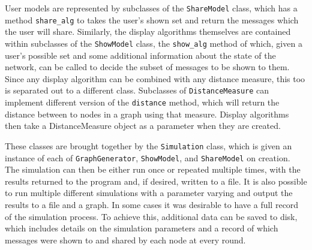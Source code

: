 \documentclass[bsc,frontabs,twoside,singlespacing,parskip,deptreport]{infthesis}     %
\begin{document}
User models are represented by subclasses of the \texttt{ShareModel} class, which has a method \texttt{share\_alg} to takes the user's shown set and return the messages which the user will share. Similarly, the display algorithms themselves are contained within subclasses of the \texttt{ShowModel} class, the \texttt{show\_alg} method of which, given a user's possible set and some additional information about the state of the network, can be called to decide the subset of messages to be shown to them. Since any display algorithm can be combined with any distance measure, this too is separated out to a different class. Subclasses of \texttt{DistanceMeasure} can implement different version of the \texttt{distance} method, which will return the distance between to nodes in a graph using that measure. Display algorithms then take a DistanceMeasure object as a parameter when they are created.

These classes are brought together by the \texttt{Simulation} class, which is given an instance of each of \texttt{GraphGenerator}, \texttt{ShowModel}, and \texttt{ShareModel} on creation. The simulation can then be either run once or repeated multiple times, with the results returned to the program and, if desired, written to a file. It is also possible to run multiple different simulations with a parameter varying and output the results to a file and a graph. In some cases it was desirable to have a full record of the simulation process. To achieve this, additional data can be saved to disk, which includes details on the simulation parameters and a record of which messages were shown to and shared by each node at every round.
\end{document}
